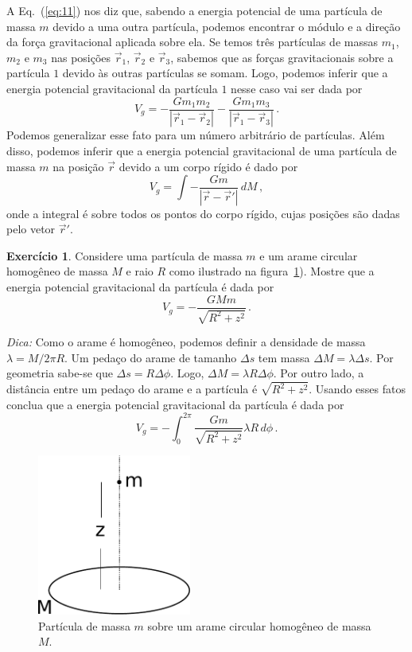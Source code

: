 \documentclass[twocolumn=on,fontsize=12pt,DIV=calc]{scrartcl}
\theoremstyle{definition}
\newtheorem{ex}{Exercício}[section]
\begin{document}
A Eq.~(\ref{eq:11}) nos diz que, sabendo a energia potencial de uma
partícula de massa $m$ devido a uma outra partícula, podemos encontrar
o módulo e a direção da força gravitacional aplicada sobre ela. Se
temos três partículas de massas $m_1$, $m_2$ e $m_3$ nas posições
$\vec r_1$, $\vec r_2$ e $\vec r_3$, sabemos que as forças
gravitacionais sobre a partícula $1$ devido às outras partículas se
somam. Logo, podemos inferir que a energia potencial gravitacional da
partícula $1$ nesse caso vai ser dada por
$$V_g=-\frac{Gm_1m_2}{|\vec r_1-\vec r_2|}-\frac{Gm_1m_3}{|\vec r_1-\vec r_3|}\,.$$
Podemos generalizar esse fato para um número arbitrário de
partículas. Além disso, podemos inferir que a energia potencial
gravitacional de uma partícula de massa $m$ na posição $\vec r$ devido
a um corpo rígido é dado por
$$V_g=\int -\frac{Gm}{|\vec r-\vec r'|}\,dM\,,$$
onde a integral é sobre todos os pontos do corpo rígido, cujas
posições são dadas pelo vetor $\vec r'$.

\begin{ex}
  Considere uma partícula de massa $m$ e um arame circular homogêneo
  de massa $M$ e raio $R$ como ilustrado na
  figura~\ref{fig:potencial_espira}). Mostre que a energia potencial
  gravitacional da partícula é dada por
  $$V_g=-\frac{GMm}{\sqrt{R^2+z^2}}\,.$$

  \noindent\textit{Dica:} Como o arame é homogêneo, podemos definir a
  densidade de massa $\lambda=M/2\pi R$. Um pedaço do arame de tamanho
  $\Delta s$ tem massa $\Delta M=\lambda\Delta s$. Por geometria
  sabe-se que $\Delta s=R\Delta\phi$. Logo,
  $\Delta M=\lambda R\Delta\phi$. Por outro lado, a distância entre um
  pedaço do arame e a partícula é $\sqrt{R^2+z^2}$. Usando esses fatos
  conclua que a energia potencial gravitacional da partícula é dada
  por
  $$V_g=-\int_0^{2\pi}\frac{Gm}{\sqrt{R^2+z^2}}\lambda R\,d\phi\,.$$
  \begin{figure}[ht]
    \centering
    \includegraphics[width=0.45\textwidth,keepaspectratio]{aux/potencial_espira.pdf}
    \caption{Partícula de massa $m$ sobre um arame circular homogêneo
      de massa $M$.}
    \label{fig:potencial_espira}
  \end{figure}
\end{ex}
\end{document}

